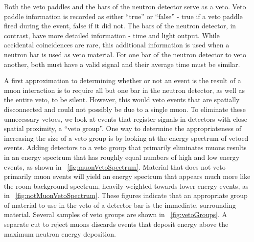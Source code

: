 Both the veto paddles and the bars of the neutron detector serve as a veto.  Veto paddle information is recorded as either ``true'' or ``false'' - true if a veto paddle fired during the event, false if it did not.  The bars of the neutron detector, in contrast, have more detailed information - time and light output.  While accidental coincidences are rare, this additional information is used when a neutron bar is used as veto material.  For one bar of the neutron detector to veto another, both must have a valid signal and their average time must be similar.

A first approximation to determining whether or not an event is the result of a muon interaction is to require all but one bar in the neutron detector, as well as the entire veto, to be silent.  However, this would veto events that are spatially disconnected and could not possibly be due to a single muon.  To eliminate these unnecessary vetoes, we look at events that register signals in detectors with close spatial proximity, a ``veto group''.  One way to determine the appropriateness of increasing the size of a veto group is by looking at the energy spectrum of vetoed events.  Adding detectors to a veto group that primarily eliminates muons results in an energy spectrum that has roughly equal numbers of high and low energy events, as shown in {\fig}~\ref{fig:muonVetoSpectrum}.  Material that does not veto primarily muon events will yield an energy spectrum that appears much more like the room background spectrum, heavily weighted towards lower energy events, as in {\fig}~\ref{fig:notMuonVetoSpectrum}.  These figures indicate that an appropriate group of material to use in the veto of a detector bar is the immediate, surrounding material.  Several samples of veto groups are shown in {\fig}~\ref{fig:vetoGroups}.  A separate cut to reject muons discards events that deposit energy above the maximum neutron energy deposition.    
